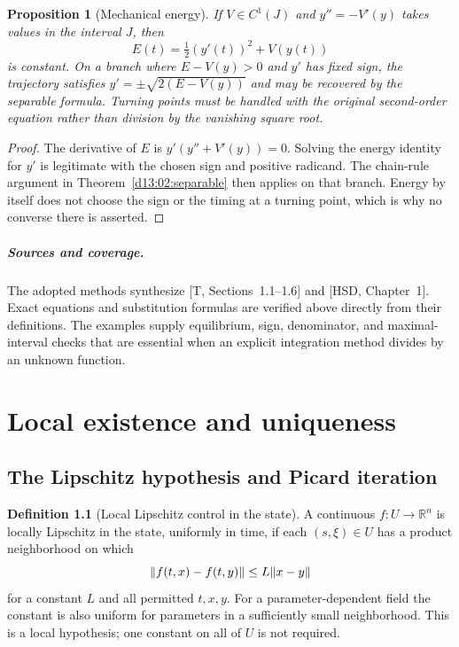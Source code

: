 \documentclass[11pt,oneside]{book}
\newtheorem{proposition}[theorem]{Proposition}
\theoremstyle{definition}
\newtheorem{definition}[theorem]{Definition}
\theoremstyle{remark}\newtheorem{remark}[theorem]{Remark}
\newcommand{\R}{\mathbb R}\newcommand{\C}{\mathbb C}
\begin{document}
\begin{proposition}[Mechanical energy]\label{d13:02:energy}
If $V\in C^1(J)$ and $y''=-V'(y)$ takes values in the interval $J$, then
\[
 E(t)=\tfrac12(y'(t))^2+V(y(t))
\]
is constant. On a branch where $E-V(y)>0$ and $y'$ has fixed sign,
the trajectory satisfies $y'=\pm\sqrt{2(E-V(y))}$ and may be recovered
by the separable formula. Turning points must be handled with the original
second-order equation rather than division by the vanishing square root.
\end{proposition}
\begin{proof}
The derivative of $E$ is $y'(y''+V'(y))=0$. Solving the energy identity
for $y'$ is legitimate with the chosen sign and positive radicand.
The chain-rule argument in Theorem~\ref{d13:02:separable} then applies on
that branch. Energy by itself does not choose the sign or the timing at a
turning point, which is why no converse there is asserted.
\end{proof}

\paragraph{Sources and coverage.}
The adopted methods synthesize [T, Sections~1.1--1.6] and [HSD,
Chapter~1]. Exact equations and substitution formulas are verified above
directly from their definitions. The examples supply equilibrium, sign,
denominator, and maximal-interval checks that are essential when an
explicit integration method divides by an unknown function.



\chapter{Local existence and uniqueness}\label{ch:d13-03}

\section{The Lipschitz hypothesis and Picard iteration}
\begin{definition}[Local Lipschitz control in the state]\label{d13:03:lipschitz}
A continuous $f:U\to\R^n$ is locally Lipschitz in the state, uniformly
in time, if each $(s,\xi)\in U$ has a product neighborhood on which
\[
 \lVert f(t,x)-f(t,y)\rVert\leq L\lVert x-y\rVert
\]
for a constant $L$ and all permitted $t,x,y$. For a parameter-dependent
field the constant is also uniform for parameters in a sufficiently small
neighborhood. This is a local hypothesis; one constant on all of $U$
is not required.
\end{definition}
\end{document}
